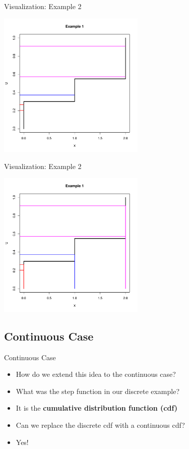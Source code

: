 \documentclass
[handout]
{beamer}
\begin{document}
\begin{frame}{Visualization: Example 2}
\begin{center}
\includegraphics[height=7cm]{./Pics/d2p2.pdf}
\end{center}
\end{frame}
\begin{frame}{Visualization: Example 2}
\begin{center}
\includegraphics[height=7cm]{./Pics/d2p3.pdf}
\end{center}
\end{frame}
\subsection{Continuous Case}
\begin{frame}{Continuous Case}
\begin{itemize}
\item How do we extend this idea to the continuous case?
\pause
\item What was the step function in our discrete example?
\pause
\item It is the {\bf cumulative distribution function (cdf)}
\pause
\item Can we replace the discrete cdf with a continuous cdf?
\pause
\item Yes!
\end{itemize}
\end{frame}
\end{document}
